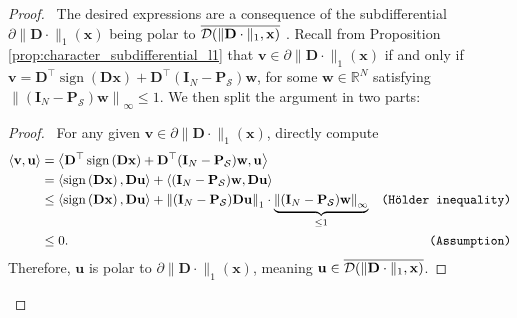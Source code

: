 \begin{proof}
    \pf\ The desired expressions are a consequence of the subdifferential $\partial \|\mathbf{D} \cdot\|_1(\mathbf{x})$ being polar to $\mathop{\overline{\mathcal{D}(\| \mathbf{D} \cdot \|_1, \mathbf{x})}}$ \cite[Thm. 23.7]{rockafellar1970}. Recall from Proposition \ref{prop:character_subdifferential_l1} that $\mathbf{v} \in \partial \|\mathbf{D} \cdot\|_1(\mathbf{x})$ if and only if $\mathbf{v} = \mathbf{D}^\top \operatorname{sign} \left ( \mathbf{Dx} \right ) + \mathbf{D}^\top (\mathbf{I}_N - \mathbf{P}_{\mathcal{S}}) \mathbf{w}$, for some $\mathbf{w} \in \mathbb{R}^{N}$ satisfying $\left\|(\mathbf{I}_N - \mathbf{P}_{\mathcal{S}}) \mathbf{w}\right\|_\infty \leq 1$. We then split the argument in two parts:

        \begin{proof}
            \pf\ For any given $\mathbf{v} \in \partial \|\mathbf{D} \cdot\|_1(\mathbf{x})$, directly compute
            \begin{align*}
                \langle \mathbf{v}, \mathbf{u} \rangle & = \left\langle \mathbf{D}^\top \operatorname{sign} \left( \mathbf{Dx} \right) + \mathbf{D}^\top (\mathbf{I}_N - \mathbf{P}_{\mathcal{S}}) \mathbf{w}, \mathbf{u} \right\rangle \\
                & = \left\langle \operatorname{sign} \left ( \mathbf{Dx} \right ), \mathbf{Du} \right\rangle + \left\langle (\mathbf{I}_N - \mathbf{P}_{\mathcal{S}}) \mathbf{w}, \mathbf{Du} \right \rangle \\
                & \leq \left\langle \operatorname{sign} \left ( \mathbf{Dx} \right ), \mathbf{Du} \right\rangle + \left\|(\mathbf{I}_N - \mathbf{P}_{\mathcal{S}}) \mathbf{Du}\right\|_1 \cdot \underbrace{\left\|(\mathbf{I}_N - \mathbf{P}_{\mathcal{S}}) \mathbf{w}\right\|_\infty}_{\leq 1} & \texttt{(H\"older inequality)} \\
                & \leq 0. & \texttt{(Assumption)}
            \end{align*}
            Therefore, $\mathbf{u}$ is polar to $\partial \|\mathbf{D} \cdot\|_1(\mathbf{x})$, meaning $\mathbf{u} \in \mathop{\overline{\mathcal{D}(\| \mathbf{D} \cdot \|_1, \mathbf{x})}}$.\hfill\qedsymbol
        \end{proof}


\end{proof}
